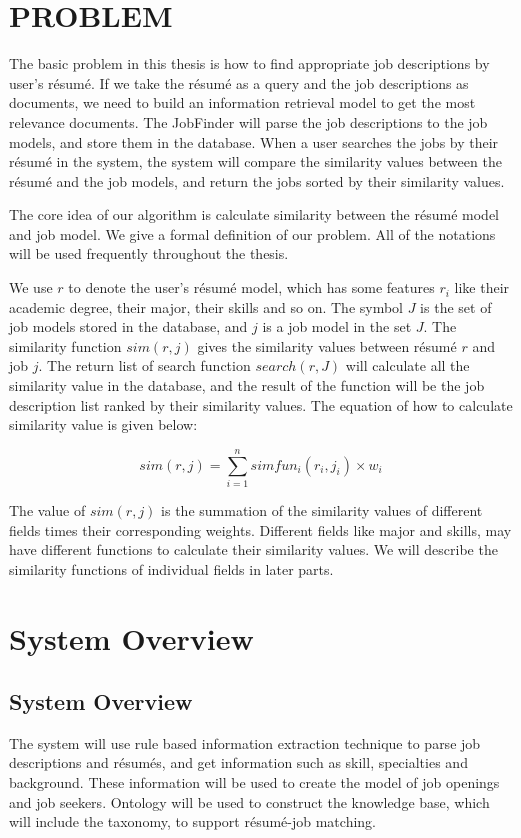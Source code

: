 \chapter{PROBLEM}

The basic problem in this thesis is how to find appropriate job descriptions by user's r\'esum\'e. If we take the r\'esum\'e as a query and the job descriptions as documents, we need to build an information retrieval model to get the most relevance documents.  The JobFinder will parse the job descriptions to the job models, and store them in the database. When a user searches the jobs by their r\'esum\'e in the system, the system will compare the similarity values between the r\'esum\'e and the job models, and return the jobs sorted by their similarity values.

The core idea of our algorithm is calculate similarity between the r\'esum\'e model and job model.
We give a formal definition of our problem. All of the notations will be used frequently throughout the thesis.

We use $r$ to denote the user's r\'esum\'e model, which has some features $r_i$ like their academic degree, their major, their skills and so on. The symbol $J$ is the set of job models stored in the database, and $j$ is a job model in the set $J$. The similarity function $sim(r, j)$ gives the similarity values between r\'esum\'e $r$ and job $j$. The return list of search function $search(r,J)$ will calculate all the similarity value in the database, and the result of the function will be the job description list ranked by their similarity values. The equation of how to calculate similarity value is given below:

$$ sim(r, j) = \sum_{i=1}^{n} simfun_i(r_i,j_i) \times w_i $$

The value of $sim(r, j)$ is the summation of the similarity values of different fields times their corresponding weights. Different fields like major and skills,  may have different functions to calculate their similarity values. We will describe the similarity functions of individual fields in later parts.

\chapter{System Overview}

\section{System Overview}
The system will use rule based information extraction technique to parse job descriptions and r\'esum\'es, and get information such as skill, specialties and background. These information will be used to create the model of job openings and job seekers. Ontology will be used to construct the knowledge base, which will include the taxonomy, to support r\'esum\'e-job matching.

